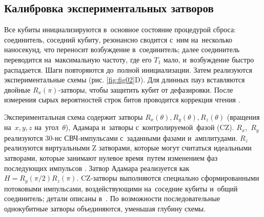 \begin{table}[h]

    \label{tab:tab10}
\end{table}


\subsection*{Калибровка экспериментальных затворов}

Все кубиты инициализируются в основное состояние процедурой сброса:
соединитель, соседний кубиту, резонансно сводится с ним на несколько
наносекунд, что переносит возбуждение в соединитель; далее соединитель
переводится на максимальную частоту, где его $T_{1}$ мало, и возбуждение быстро
распадается. Шаги повторяются до полной инициализации. Затем реализуются
экспериментальные схемы (рис. \ref{fig:fig02}D). Для длинных пауз вставляются
двойные $R_{x}(\pi)$‑затворы, чтобы защитить кубит от дефазировки. После
измерения сырых вероятностей строк битов проводится коррекция чтения
\cite{cite_45}.

Экспериментальная схема содержит затворы $R_{x}(\theta),R_{y}(\theta),R_{z}
(\theta)$ (вращения на $x,y,z$ на угол $\theta$), Адамара и затворы
с контролируемой фазой (CZ). $R_{x}$, $R_{y}$ реализуются 30‑нс СВЧ‑импульсами
с заданными фазами и амплитудами. $R_{z}$ реализуются виртуальными Z затворами,
которые могут считаться идеальными затворами, которые занимают нулевое
время путем изменением фаз последующих импульсов \cite{cite_46}. Затвор Адамара
реализуется как $H = R_{y}(\pi/2)R_{z}(\pi)$. CZ‑затворы выполняются специально
сформированными потоковыми импульсами, воздействующими на соседние кубиты
и общий соединитель; детали описаны в \cite{cite_34,cite_47}. По возможности
последовательные однокубитные затворы объединяются, уменьшая глубину схемы.

